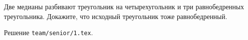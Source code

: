 \problem{}
Две медианы разбивают треугольник на четырехугольник и три равнобедренных
треугольника.
Докажите, что исходный треугольник тоже равнобедренный.

\solution
Решение \texttt{team/senior/1.tex}.
\endproblem
